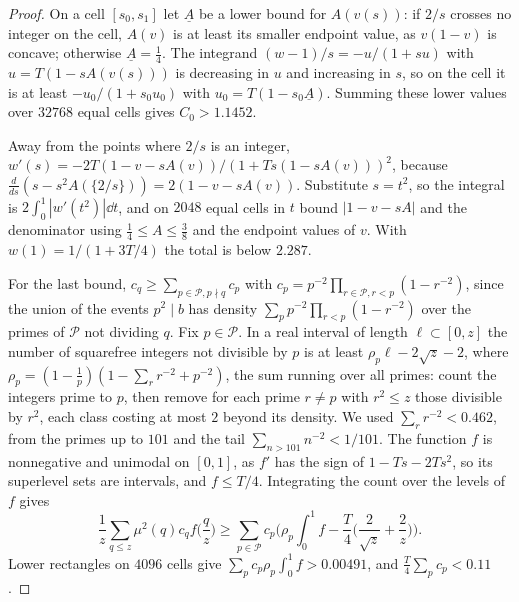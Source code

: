 \documentclass[11pt,colorlinks]{charlie}
\newcommand{\cP}{\mathcal P}
\begin{document}
\begin{proof}
On a cell $[s_0,s_1]$ let $\underline A$ be a lower bound for $A(v(s))$: if $2/s$ crosses no integer on the cell, $A(v)$ is at least its smaller endpoint value, as $v(1-v)$ is concave; otherwise $\underline A=\frac14$. The integrand $(w-1)/s=-u/(1+su)$ with $u=T(1-sA(v(s)))$ is decreasing in $u$ and increasing in $s$, so on the cell it is at least $-u_0/(1+s_0u_0)$ with $u_0=T(1-s_0\underline A)$. Summing these lower values over $32768$ equal cells gives $C_0>1.1452$.

Away from the points where $2/s$ is an integer, $w'(s)=-2T(1-v-sA(v))/(1+Ts(1-sA(v)))^2$, because $\frac{d}{ds}(s-s^2A(\{2/s\}))=2(1-v-sA(v))$. Substitute $s=t^2$, so the integral is $2\int_0^1|w'(t^2)|\dd t$, and on $2048$ equal cells in $t$ bound $|1-v-sA|$ and the denominator using $\frac14\le A\le\frac38$ and the endpoint values of $v$. With $w(1)=1/(1+3T/4)$ the total is below $2.287$.

For the last bound, $c_q\ge\sum_{p\in\cP,p\nmid q}c_p$ with $c_p=p^{-2}\prod_{r\in\cP,r<p}(1-r^{-2})$, since the union of the events $p^2\mid b$ has density $\sum_pp^{-2}\prod_{r<p}(1-r^{-2})$ over the primes of $\cP$ not dividing $q$. Fix $p\in\cP$. In a real interval of length $\ell\subset[0,z]$ the number of squarefree integers not divisible by $p$ is at least $\rho_p\ell-2\sqrt z-2$, where $\rho_p=(1-\frac1p)(1-\sum_rr^{-2}+p^{-2})$, the sum running over all primes: count the integers prime to $p$, then remove for each prime $r\ne p$ with $r^2\le z$ those divisible by $r^2$, each class costing at most $2$ beyond its density. We used $\sum_rr^{-2}<0.462$, from the primes up to $101$ and the tail $\sum_{n>101}n^{-2}<1/101$. The function $f$ is nonnegative and unimodal on $[0,1]$, as $f'$ has the sign of $1-Ts-2Ts^2$, so its superlevel sets are intervals, and $f\le T/4$. Integrating the count over the levels of $f$ gives
\[
 \frac1z\sum_{q\le z}\mu^2(q)c_qf\Big(\frac qz\Big)\ge\sum_{p\in\cP}c_p\Big(\rho_p\int_0^1f-\frac T4\Big(\frac2{\sqrt z}+\frac2z\Big)\Big).
\]
Lower rectangles on $4096$ cells give $\sum_pc_p\rho_p\int_0^1f>0.00491$, and $\frac T4\sum_pc_p<0.11$.
\end{proof}
\end{document}
